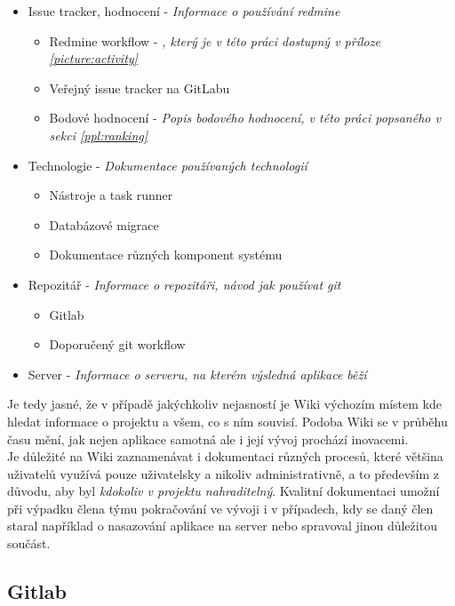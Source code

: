 \begin{itemize}
	\item Issue tracker, hodnocení - \emph{Informace o používání redmine}
	\begin{itemize}
		\item Redmine workflow - \emph{, který je v této práci dostupný v příloze \ref{picture:activity}}
		\item Veřejný issue tracker na GitLabu
		\item Bodové hodnocení - \emph{Popis bodového hodnocení, v této práci popsaného v sekci \ref{ppl:ranking}}
	\end{itemize}
	\item Technologie - \emph{Dokumentace používaných technologií}
	\begin{itemize}
		\item Nástroje a task runner
		\item Databázové migrace
		\item Dokumentace různých komponent systému
	\end{itemize}
	\item Repozitář - \emph{Informace o repozitáři, návod jak používat git}
	\begin{itemize}
		\item Gitlab
		\item Doporučený git workflow
	\end{itemize}
	\item Server - \emph{Informace o serveru, na kterém výsledná aplikace běží}
\end{itemize}

Je tedy jasné, že v případě jakýchkoliv nejasností je Wiki výchozím místem kde hledat informace o projektu a všem, co s ním souvisí. Podoba Wiki se v průběhu času mění, jak nejen aplikace samotná ale i její vývoj prochází inovacemi.\\
Je důležité na Wiki zaznamenávat i dokumentaci různých procesů, které většina uživatelů využívá pouze uživatelsky a nikoliv administrativně, a to především z důvodu, aby byl \emph{kdokoliv v projektu nahraditelný}. Kvalitní dokumentaci umožní při výpadku člena týmu pokračování ve vývoji i v případech, kdy se daný člen staral například o nasazování aplikace na server nebo spravoval jinou důležitou součást.

\subsection{Gitlab}

